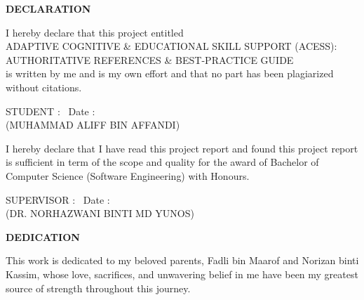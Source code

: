 \documentclass[12pt, oneside]{article} %
\begin{document}
\newpage




\begin{center}

\vfill\null
{}
{}
\textbf{DECLARATION}

\vspace{1.5cm}
I hereby declare that this project entitled \\
ADAPTIVE COGNITIVE \& EDUCATIONAL SKILL SUPPORT (ACESS): AUTHORITATIVE REFERENCES \& BEST-PRACTICE GUIDE \\
is written by me and is my own effort and that no part has been plagiarized without citations.



\vspace{1.5cm}
\noindent
STUDENT \; : \underline{\hspace{8cm}} \, Date :  \underline{\hspace{2.1cm}} \\[-2mm]
(MUHAMMAD ALIFF BIN AFFANDI) \hspace{1.2cm}



\vspace{4cm}
\noindent
I hereby declare that I have read this project report and found this project report is sufficient in term of the scope and quality for the award of Bachelor of Computer Science (Software Engineering) with Honours.


\vspace{1.5cm}
\noindent
SUPERVISOR \; : \underline{\hspace{8cm}} \, Date :  \underline{\hspace{2.1cm}} \\[-2mm]
(DR. NORHAZWANI BINTI MD YUNOS) \hspace{0.6cm}


\end{center}

\vfill \null

\newpage





\begin{center}
{}
\textbf{DEDICATION}
\end{center}


\vspace{1cm}
This work is dedicated to my beloved parents, Fadli bin Maarof and Norizan binti Kassim, whose love, sacrifices, and unwavering belief in me have been my greatest source of strength throughout this journey.
\end{document}
